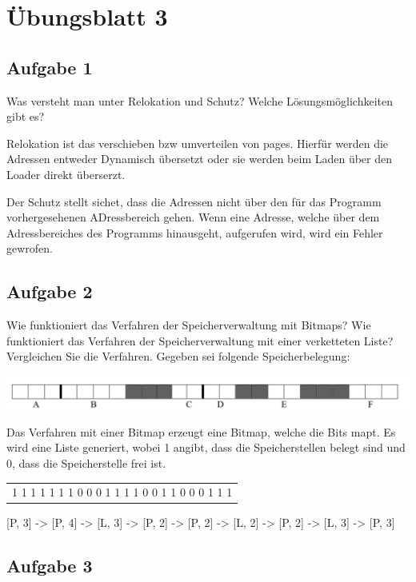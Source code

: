 \chapter{Übungsblatt 3}

\section{Aufgabe 1}

Was versteht man unter Relokation und Schutz? Welche Lösungsmöglichkeiten gibt
es?

Relokation ist das verschieben bzw umverteilen von pages. Hierfür werden die
Adressen entweder Dynamisch übersetzt oder sie werden beim Laden über den
Loader direkt überserzt.

Der Schutz stellt sichet, dass die Adressen nicht über den für das Programm
vorhergesehenen ADressbereich gehen. Wenn eine Adresse, welche über dem
Adressbereiches des Programms hinausgeht, aufgerufen wird, wird ein Fehler
gewrofen.

\section{Aufgabe 2}

Wie funktioniert das Verfahren der Speicherverwaltung mit Bitmaps? Wie
funktioniert das Verfahren der Speicherverwaltung mit einer verketteten Liste?
Vergleichen Sie die Verfahren. Gegeben sei folgende Speicherbelegung:

\includegraphics[width=\textwidth]{assets/uebungsblatt_3_task_2.png}

Das Verfahren mit einer Bitmap erzeugt eine Bitmap, welche die Bits mapt. Es
wird eine Liste generiert, wobei 1 angibt, dass die Speicherstellen belegt sind
und 0, dass die Speicherstelle frei ist.

\begin{tabular}{ | c | }
  1 1 1 1 1 1 1 0 0 0 1 1 1 1 0 0 1 1 0 0 0 1 1 1
\end{tabular}

[P, 3] -> [P, 4] -> [L, 3] -> [P, 2] -> [P, 2] -> [L, 2] -> [P, 2] -> [L, 3] -> [P, 3]

\section{Aufgabe 3}

